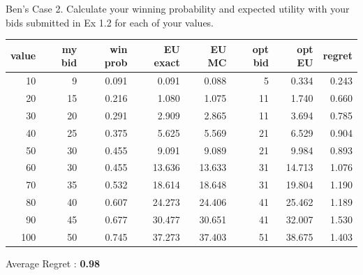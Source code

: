 \documentclass{beamer}
\begin{document}
\begin{frame}{Ben's Case}
2. Calculate your winning probability and expected utility with your bids submitted in Ex 1.2 for each of your values.
\begin{center}
\small
\begin{tabular}{@{}rrrrrrrr@{}}
\toprule
value & my bid & win prob & EU exact & EU MC & opt bid & opt EU & regret \\
\midrule
 10 &   9 & 0.091 & 0.091 & 0.088 &  5 & 0.334 & 0.243 \\
 20 &  15 & 0.216 & 1.080 & 1.075 & 11 & 1.740 & 0.660 \\
 30 &  20 & 0.291 & 2.909 & 2.865 & 11 & 3.694 & 0.785 \\
 40 &  25 & 0.375 & 5.625 & 5.569 & 21 & 6.529 & 0.904 \\
 50 &  30 & 0.455 & 9.091 & 9.089 & 21 & 9.984 & 0.893 \\
 60 &  30 & 0.455 &13.636 &13.633 & 31 &14.713 & 1.076 \\
 70 &  35 & 0.532 &18.614 &18.648 & 31 &19.804 & 1.190 \\
 80 &  40 & 0.607 &24.273 &24.406 & 41 &25.462 & 1.189 \\
 90 &  45 & 0.677 &30.477 &30.651 & 41 &32.007 & 1.530 \\
100 &  50 & 0.745 &37.273 &37.403 & 51 &38.675 & 1.403 \\
\bottomrule
\end{tabular}
\end{center}
Average Regret : \textbf{0.98}
\end{frame}

\end{document}
